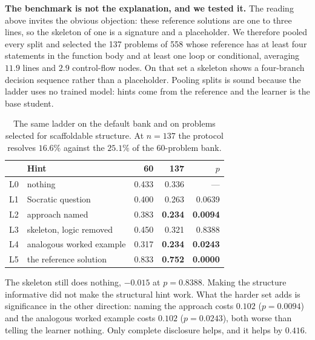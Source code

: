 %
\textbf{The benchmark is not the explanation, and we tested it.} The reading
above invites the obvious objection: these reference solutions are one to three
lines, so the skeleton of one is a signature and a placeholder. We therefore
pooled every split and selected the 137 problems of 558 whose reference has at
least four statements in the function body and at least one loop or
conditional, averaging $11.9$ lines and $2.9$ control-flow nodes. On that set a
skeleton shows a four-branch decision sequence rather than a placeholder.
Pooling splits is sound because the ladder uses no trained model: hints come
from the reference and the learner is the base student.

\begin{table}[t]
\caption{The same ladder on the default bank and on problems selected for
scaffoldable structure. At $n{=}137$ the protocol resolves $16.6\%$ against the
$25.1\%$ of the 60-problem bank.}
\label{tab:ladder2}
\centering
\small
\begin{tabular}{llrrr}
\toprule
 & \textbf{Hint} & \textbf{60} & \textbf{137} & \textbf{$p$} \\
\midrule
L0 & nothing                  & 0.433 & 0.336 & --- \\
L1 & Socratic question        & 0.400 & 0.263 & 0.0639 \\
L2 & approach named           & 0.383 & \textbf{0.234} & \textbf{0.0094} \\
L3 & skeleton, logic removed  & 0.450 & 0.321 & 0.8388 \\
L4 & analogous worked example & 0.317 & \textbf{0.234} & \textbf{0.0243} \\
L5 & the reference solution    & 0.833 & \textbf{0.752} & \textbf{0.0000} \\
\bottomrule
\end{tabular}
\end{table}

The skeleton still does nothing, $-0.015$ at $p{=}0.8388$. Making the structure
informative did not make the structural hint work. What the harder set adds is
significance in the other direction: naming the approach costs $0.102$
($p{=}0.0094$) and the analogous worked example costs $0.102$ ($p{=}0.0243$),
both worse than telling the learner nothing. Only complete disclosure helps,
and it helps by $0.416$.

